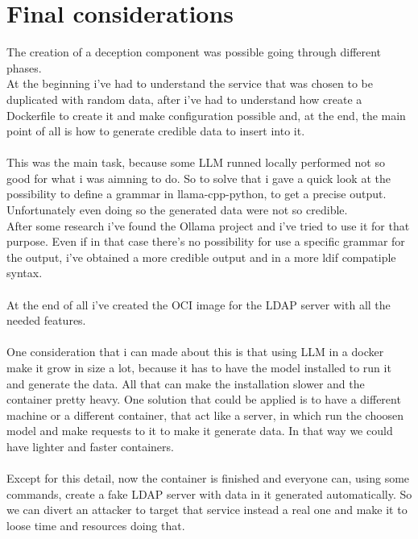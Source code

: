 \chapter{Final considerations}
The creation of a deception component was possible going through different phases.
\\
At the beginning i've had to understand the service that was chosen to be duplicated with random data, after i've had to understand how create a Dockerfile to create it and make configuration possible and, at the end, the main point of all is how to generate credible data to insert into it.
\\\\
This was the main task, because some LLM runned locally performed not so good for what i was aimning to do. So to solve that i gave a quick look at the possibility to define a grammar in llama-cpp-python, to get a precise output. Unfortunately even doing so the generated data were not so credible.
\\
After some research i've found the Ollama project and i've tried to use it for that purpose. Even if in that case there's no possibility for use a specific grammar for the output, i've obtained a more credible output and in a more ldif compatiple syntax.
\\\\
At the end of all i've created the OCI image for the LDAP server with all the needed features.
\\\\
One consideration that i can made about this is that using LLM in a docker make it grow in size a lot, because it has to have the model installed to run it and generate the data. All that can make the installation slower and the container pretty heavy. One solution that could be applied is to have a different machine or a different container, that act like a server, in which run the choosen model and make requests to it to make it generate data. In that way we could have lighter and faster containers.
\\\\
Except for this detail, now the container is finished and everyone can, using some commands, create a fake LDAP server with data in it generated automatically. So we can divert an attacker to target that service instead a real one and make it to loose time and resources doing that.
